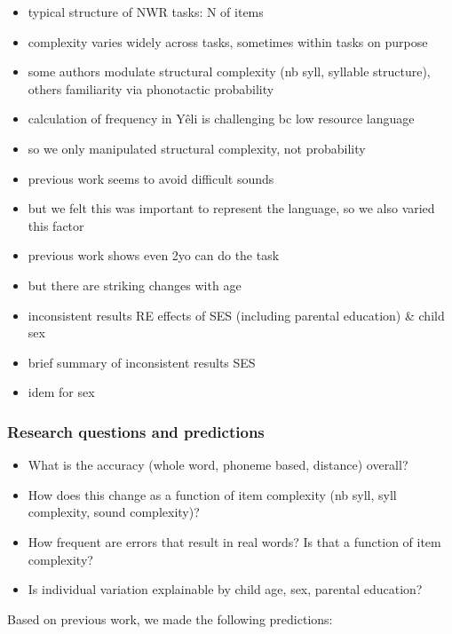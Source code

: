 \documentclass[english,,man,floatsintext]{apa6}
\providecommand{\tightlist}{%
  \setlength{\itemsep}{0pt}\setlength{\parskip}{0pt}}
\begin{document}
\begin{itemize}
\item
  typical structure of NWR tasks: N of items
\item
  complexity varies widely across tasks, sometimes within tasks on purpose
\item
  some authors modulate structural complexity (nb syll, syllable structure), others familiarity via phonotactic probability
\item
  calculation of frequency in Yêli is challenging bc low resource language
\item
  so we only manipulated structural complexity, not probability
\item
  previous work seems to avoid difficult sounds
\item
  but we felt this was important to represent the language, so we also varied this factor
\item
  previous work shows even 2yo can do the task
\item
  but there are striking changes with age
\item
  inconsistent results RE effects of SES (including parental education) \& child sex
\item
  brief summary of inconsistent results SES
\item
  idem for sex
\end{itemize}

\hypertarget{research-questions-and-predictions}{%
\subsubsection{Research questions and predictions}\label{research-questions-and-predictions}}

\begin{itemize}
\tightlist
\item
  What is the accuracy (whole word, phoneme based, distance) overall?
\item
  How does this change as a function of item complexity (nb syll, syll complexity, sound complexity)?
\item
  How frequent are errors that result in real words? Is that a function of item complexity?
\item
  Is individual variation explainable by child age, sex, parental education?
\end{itemize}

Based on previous work, we made the following predictions:
\end{document}
